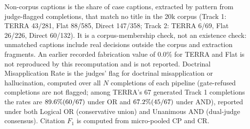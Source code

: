 \begin{table}[!t]
Non-corpus captions is the share of case captions, extracted by pattern from judge-flagged completions, that match no title in the 20k corpus (Track 1: TERRA 43/281, Flat 88/585, Direct 147/358; Track 2: TERRA 6/69, Flat 26/226, Direct 60/132). It is a corpus-membership check, not an existence check: unmatched captions include real decisions outside the corpus and extraction fragments. An earlier recorded fabrication value of 0.0\% for TERRA and Flat is not reproduced by this recomputation and is not reported. Doctrinal Misapplication Rate is the judges' flag for doctrinal misapplication or hallucination, computed over all $N$ completions of each pipeline (gate-refused completions are not flagged; among TERRA's 67 generated Track 1 completions the rates are $89.6\% (60/67)$ under OR and $67.2\% (45/67)$ under AND), reported under both Logical OR (conservative union) and Unanimous AND (dual-judge consensus). Citation $F_1$ is computed from micro-pooled CP and CR.
\end{table}

